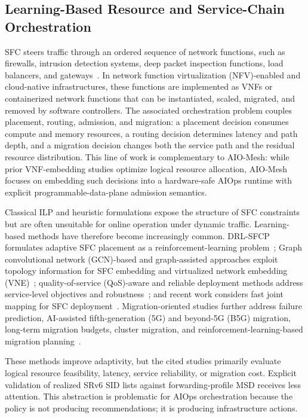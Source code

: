 \documentclass[final,5p]{elsarticle}
\newcommand{\rev}[1]{\textcolor{revisiongreen}{#1}}
\let\newrev\rev
\begin{document}
\subsection{Learning-Based Resource and Service-Chain Orchestration}
\label{subsec:related_learning}

\rev{SFC} steers traffic through an ordered sequence of network functions, such as firewalls, intrusion detection systems, deep packet inspection functions, load balancers, and gateways~\cite{rfc7665}. In \rev{network function virtualization (NFV)}-enabled and cloud-native infrastructures, these functions are implemented as VNFs or containerized network functions that can be instantiated, scaled, migrated, and removed by software controllers. The associated orchestration problem couples placement, routing, admission, and migration: a placement decision consumes compute and memory resources, a routing decision determines latency and path depth, and a migration decision changes both the service path and the residual resource distribution. This line of work is complementary to AIO-Mesh: while prior VNF-embedding studies optimize logical resource allocation, AIO-Mesh focuses on embedding such decisions into a hardware-safe AIOps runtime with explicit programmable-data-plane admission semantics.

Classical ILP and heuristic formulations expose the structure of SFC constraints but are often unsuitable for online operation under dynamic traffic. Learning-based methods have therefore become increasingly common. DRL-SFCP formulates adaptive SFC placement as a reinforcement-learning problem~\cite{wang2021drl}; \rev{Graph convolutional network (GCN)}-based and graph-assisted approaches exploit topology information for SFC embedding and virtualized network embedding \rev{(VNE)}~\cite{xiao2023twostage,pei2025graph,liu2024sfcml}; \rev{quality-of-service (QoS)}-aware and reliable deployment methods address service-level objectives and robustness~\cite{taktak2024drl,li2023qosaware,qu2021reliable}; and recent work considers fast joint mapping for SFC deployment~\cite{wu2025drl}. Migration-oriented studies further address failure prediction, AI-assisted \newrev{fifth-generation (5G) and beyond-5G (B5G)} migration, long-term migration budgets, cluster migration, and reinforcement-learning-based migration planning~\cite{zhai2023migration,addad2022ai,qin2023sfcmigrationbudget,afrasiabi2024cluster,zhang2025sfcmigration,hu2026rlpmo}.

These methods improve adaptivity, but \rev{the cited studies primarily evaluate logical resource feasibility, latency, service reliability, or migration cost. Explicit validation of realized SRv6 SID lists against forwarding-profile MSD receives less attention.} This abstraction is problematic for AIOps orchestration because the policy is not producing recommendations; it is producing infrastructure actions.
\end{document}
